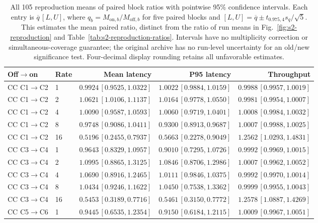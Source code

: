 \clearpage
\begin{table}[p]
\centering\footnotesize
\caption{All 105 reproduction means of paired block ratios with pointwise 95\% confidence intervals. Each entry is $\overline{q}\,[L,U]$, where $q_b=M_{\mathrm{on},b}/M_{\mathrm{off},b}$ for five paired blocks and $[L,U]=\overline{q}\pm t_{0.975,4}s_q/\sqrt{5}$. This estimates the mean paired ratio, distinct from the ratio of run means in Fig.~\ref{fig:s2-reproduction} and Table~\ref{tab:s2-reproduction-ratios}. Intervals have no multiplicity correction or simultaneous-coverage guarantee; the original archive has no run-level uncertainty for an old/new significance test. Four-decimal display rounding retains all unfavorable estimates.}
\label{tab:s2-reproduction-ci}
\setlength{\tabcolsep}{3pt}
\renewcommand{\arraystretch}{1.12}
\begin{tabular*}{\linewidth}{@{\extracolsep{\fill}}llrrr@{}}
\toprule
Off$\to$on & Rate & Mean latency & P95 latency & Throughput\\
\midrule
CC C1$\to$C2 & 1 & $0.9924\,[0.9525,1.0322]$ & $1.0022\,[0.9884,1.0159]$ & $0.9988\,[0.9957,1.0019]$\\
CC C1$\to$C2 & 2 & $1.0621\,[1.0106,1.1137]$ & $1.0164\,[0.9778,1.0550]$ & $0.9981\,[0.9954,1.0007]$\\
CC C1$\to$C2 & 4 & $1.0090\,[0.9587,1.0593]$ & $1.0060\,[0.9719,1.0401]$ & $1.0008\,[0.9984,1.0032]$\\
CC C1$\to$C2 & 8 & $0.9748\,[0.9086,1.0411]$ & $0.9300\,[0.8913,0.9687]$ & $1.0007\,[0.9988,1.0025]$\\
CC C1$\to$C2 & 16 & $0.5196\,[0.2455,0.7937]$ & $0.5663\,[0.2278,0.9049]$ & $1.2562\,[1.0293,1.4831]$\\
\midrule
CC C3$\to$C4 & 1 & $0.9643\,[0.8329,1.0957]$ & $0.9010\,[0.7295,1.0726]$ & $0.9992\,[0.9969,1.0015]$\\
CC C3$\to$C4 & 2 & $1.0995\,[0.8865,1.3125]$ & $1.0846\,[0.8706,1.2986]$ & $1.0007\,[0.9962,1.0052]$\\
CC C3$\to$C4 & 4 & $1.0690\,[0.8916,1.2465]$ & $1.0111\,[0.9846,1.0375]$ & $0.9992\,[0.9970,1.0014]$\\
CC C3$\to$C4 & 8 & $1.0434\,[0.9246,1.1622]$ & $1.0450\,[0.7538,1.3362]$ & $0.9999\,[0.9955,1.0043]$\\
CC C3$\to$C4 & 16 & $0.5453\,[0.3189,0.7716]$ & $0.5461\,[0.3150,0.7772]$ & $1.2578\,[1.0887,1.4269]$\\
\midrule
CC C5$\to$C6 & 1 & $0.9445\,[0.6535,1.2354]$ & $0.9150\,[0.6184,1.2115]$ & $1.0009\,[0.9967,1.0051]$\\

\end{tabular*}
\end{table}
